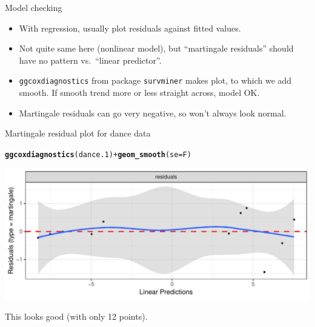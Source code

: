 \documentclass[unknownkeysallowed]{beamer}\usepackage[]{graphicx}\usepackage[]{color}
\makeatletter
\def\maxwidth{ %
  \ifdim\Gin@nat@width>\linewidth
    \linewidth
  \else
    \Gin@nat@width
  \fi
}
\newcommand{\hlopt}[1]{\textcolor[rgb]{0,0,0}{#1}}%
\newcommand{\hlstd}[1]{\textcolor[rgb]{0.345,0.345,0.345}{#1}}%
\newcommand{\hlkwc}[1]{\textcolor[rgb]{0.333,0.667,0.333}{#1}}%
\newcommand{\hlkwd}[1]{\textcolor[rgb]{0.737,0.353,0.396}{\textbf{#1}}}%
\newenvironment{kframe}{%
 \def\at@end@of@kframe{}%
 \ifinner\ifhmode%
  \def\at@end@of@kframe{\end{minipage}}%
  \begin{minipage}{\columnwidth}%
 \fi\fi%
 \def\FrameCommand##1{\hskip\@totalleftmargin \hskip-\fboxsep
 \colorbox{shadecolor}{##1}\hskip-\fboxsep
     \hskip-\linewidth \hskip-\@totalleftmargin \hskip\columnwidth}%
 \MakeFramed {\advance\hsize-\width
   \@totalleftmargin\z@ \linewidth\hsize
   \@setminipage}}%
 {\par\unskip\endMakeFramed%
 \at@end@of@kframe}
\newenvironment{knitrout}{}{} %
\makeatother
\begin{document}
\begin{frame}[fragile]{Model checking}
  
  \begin{itemize}
  \item With regression, usually plot residuals against fitted values.
  \item Not quite same here (nonlinear model), but ``martingale
    residuals'' should have no pattern vs.\ ``linear predictor''.
  \item \texttt{ggcoxdiagnostics} from package \texttt{survminer}
    makes plot, to which we add smooth. If smooth trend more or less
    straight across, model OK. 
  \item Martingale residuals can go very negative, so won't always
    look normal.
  \end{itemize}
  
\end{frame}

\begin{frame}[fragile]{Martingale residual plot for dance data}
  
\begin{knitrout}
\color{fgcolor}\begin{kframe}
\begin{alltt}
\hlkwd{ggcoxdiagnostics}\hlstd{(dance.1)}\hlopt{+}\hlkwd{geom_smooth}\hlstd{(}\hlkwc{se}\hlstd{=F)}
\end{alltt}


{\ttfamily\noindent\itshape{}}\end{kframe}
\includegraphics[width=\maxwidth]{figure/unnamed-chunk-126-1} 

\end{knitrout}

This looks good (with only 12 points).
  
\end{frame}
\end{document}
